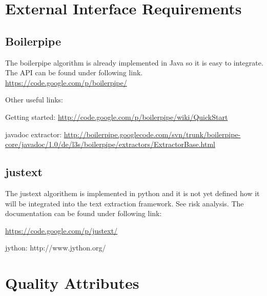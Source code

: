 \section{External Interface Requirements}

\subsection{Boilerpipe}

The boilerpipe algorithm is already implemented in Java so it is easy to integrate. The API can be found under following link. 
\url{https://code.google.com/p/boilerpipe/}

Other useful links:

Getting started:
\url{http://code.google.com/p/boilerpipe/wiki/QuickStart}

javadoc extractor:
\url{http://boilerpipe.googlecode.com/svn/trunk/boilerpipe-core/javadoc/1.0/de/l3s/boilerpipe/extractors/ExtractorBase.html}


\subsection{justext}

The justext algorithem is implemented in python and it is not yet defined how it will be integrated into the text extraction framework. See risk analysis.
The documentation can be found under following link: 

\url{https://code.google.com/p/justext/}

jython:
http://www.jython.org/



\section{Quality Attributes}
